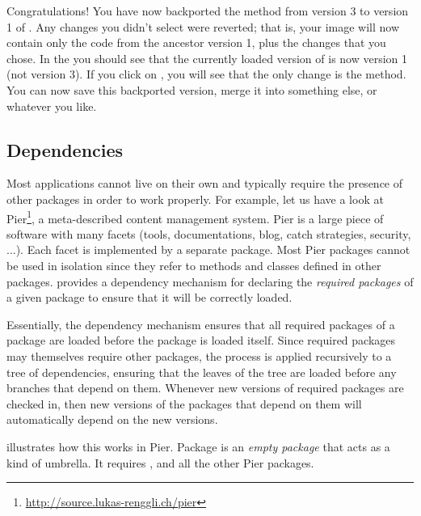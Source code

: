 \documentclass[a4paper,10pt,twoside]{book}
\begin{document}
Congratulations! You have now backported the  method from version 3 to version 1 of .
Any changes you didn't select were reverted; that is, your image will now contain only the code from the ancestor version 1, plus the changes that you chose.
In the \MCB you should see that the currently loaded version of  is now version 1 (not version 3). If you click on , you will see that the only change is the  method.
You can now save this backported version, merge it into something else, or whatever you like.

\subsection{Dependencies}

Most applications cannot live on their own and typically require the presence of other packages in order to work properly. For example, let us have a look at Pier\footnote{\url{http://source.lukas-renggli.ch/pier}}, a meta-described content management system. Pier is a large piece of software with many facets (tools, documentations, blog, catch strategies, security, ...). Each facet is implemented by a separate package. Most Pier packages cannot be used in isolation since they refer to methods and classes defined in other packages. \MC provides a dependency mechanism for declaring the \emph{required packages} of a given package to ensure that it will be correctly loaded.

Essentially, the dependency mechanism ensures that all required packages of a package are loaded before the package is loaded itself. Since required packages may themselves require other packages, the process is applied recursively to a tree of dependencies, ensuring that the leaves of the tree are loaded before any branches that depend on them.
Whenever new versions of required packages are checked in, then new versions of the packages that depend on them will automatically depend on the new versions.


 illustrates how this works in Pier.
Package  is an \emph{empty package} that acts as a kind of umbrella.
It requires ,  and all the other Pier packages.
\end{document}
